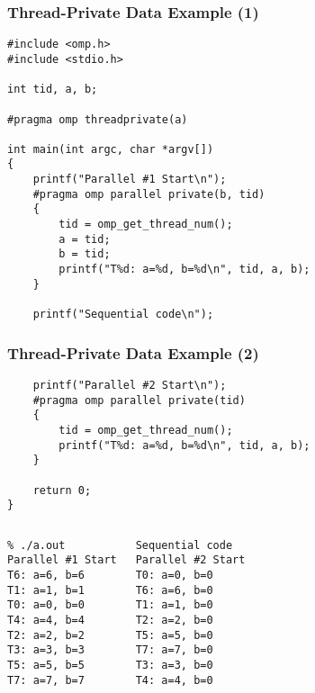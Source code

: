 \documentclass[aspectratio=43]{beamer}
\newenvironment{changemargin}[1]{%
  \begin{list}{}{%
    \setlength{\topsep}{0pt}%
    \setlength{\leftmargin}{#1}%
    \setlength{\rightmargin}{1em}
    \setlength{\listparindent}{\parindent}%
    \setlength{\itemindent}{\parindent}%
    \setlength{\parsep}{\parskip}%
  }%
  \item[]}{\end{list}}
\begin{document}
\begin{frame}[fragile]
  \frametitle{Thread-Private Data Example (1)}

  \begin{changemargin}{1cm}
  \begin{lstlisting}
#include <omp.h>
#include <stdio.h>

int tid, a, b;

#pragma omp threadprivate(a)

int main(int argc, char *argv[])
{
    printf("Parallel #1 Start\n");
    #pragma omp parallel private(b, tid)
    {
        tid = omp_get_thread_num();
        a = tid;
        b = tid;
        printf("T%d: a=%d, b=%d\n", tid, a, b);
    }

    printf("Sequential code\n");
  \end{lstlisting}
  \end{changemargin}


\end{frame}

\begin{frame}[fragile]
  \frametitle{Thread-Private Data Example (2)}

  \begin{changemargin}{1cm}
  \begin{lstlisting}
    printf("Parallel #2 Start\n");
    #pragma omp parallel private(tid)
    {
        tid = omp_get_thread_num();
        printf("T%d: a=%d, b=%d\n", tid, a, b);
    }

    return 0;
}    
  \end{lstlisting}
  \end{changemargin}
  
  \begin{center}
    \begin{columns}[c]
      \column{1.5in}
        \begin{lstlisting}
% ./a.out
Parallel #1 Start
T6: a=6, b=6
T1: a=1, b=1
T0: a=0, b=0
T4: a=4, b=4
T2: a=2, b=2
T3: a=3, b=3
T5: a=5, b=5
T7: a=7, b=7
        \end{lstlisting}
      \column{1.5in}
        \begin{lstlisting}
Sequential code
Parallel #2 Start
T0: a=0, b=0
T6: a=6, b=0
T1: a=1, b=0
T2: a=2, b=0
T5: a=5, b=0
T7: a=7, b=0
T3: a=3, b=0
T4: a=4, b=0
        \end{lstlisting}
    \end{columns}
  \end{center}
\end{frame}
\end{document}
